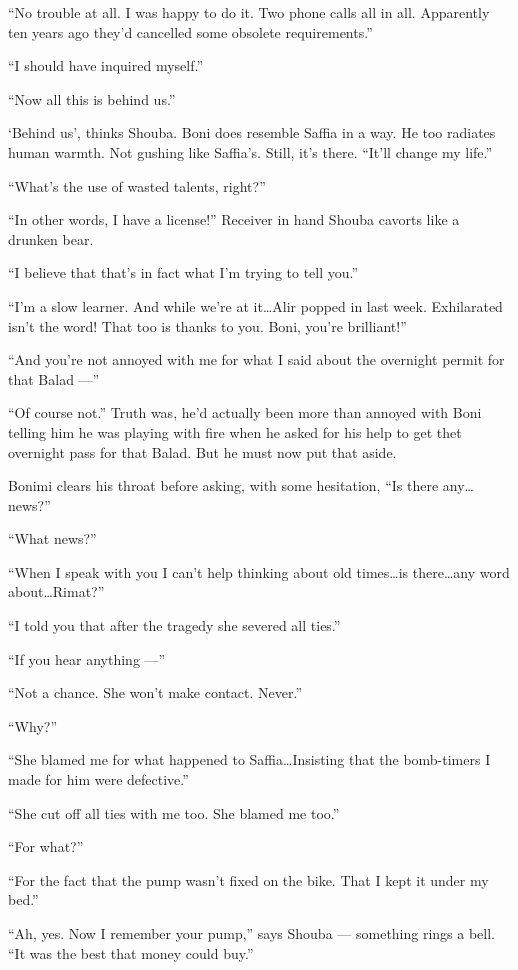 \documentclass[twoside,11pt,openany]{book}
\begin{document}
``No trouble at all. I was happy to do it. Two phone calls all in all. Apparently ten years ago
they'd cancelled some obsolete requirements.''

``I should have inquired myself.''

``Now all this is behind us.''

`Behind us', thinks Shouba. Boni does resemble Saffia in a way. He too radiates human warmth. Not gushing like
Saffia's. Still, it's there. ``It'll change my life.''

``What's the use of wasted talents, right?''

``In other words, I have a license!'' Receiver in hand Shouba cavorts like a drunken bear.

``I believe that that's in fact what I'm trying to tell you.''

``I'm a slow learner. And while we're at it{\ldots}Alir popped in last week. Exhilarated isn't the word!
That too is thanks to you. Boni, you're brilliant!''

``And you're not annoyed with me for what I said about the overnight permit for that Balad ---''

``Of course not.'' Truth{ }was, he'd actually been more than annoyed with Boni
telling him he was playing with fire when he asked for his help to get thet overnight pass for
that{ }Balad. But he must now put that aside.

Bonimi clears his throat before asking, with some hesitation, ``Is there any{\ldots}news?''

``What news?''

``When I speak with you I can't help thinking about old times{\ldots}is there{\ldots}any word about{\ldots}Rimat?''

``I told you that after the tragedy she severed all ties.''

``If you hear anything ---''

``Not a chance. She won't make contact. Never.''

``Why?''

``She blamed me for what happened to Saffia{\ldots}Insisting that the bomb-timers I made for him were
defective.''

``She cut off all ties with me too. She blamed me too.''

``For what?''

``For the fact that the pump wasn't fixed on the bike. That I kept it under my bed.''

``Ah, yes. Now I remember your pump,'' says Shouba --- something rings a bell. ``It was the best that money
could buy.''
\end{document}
